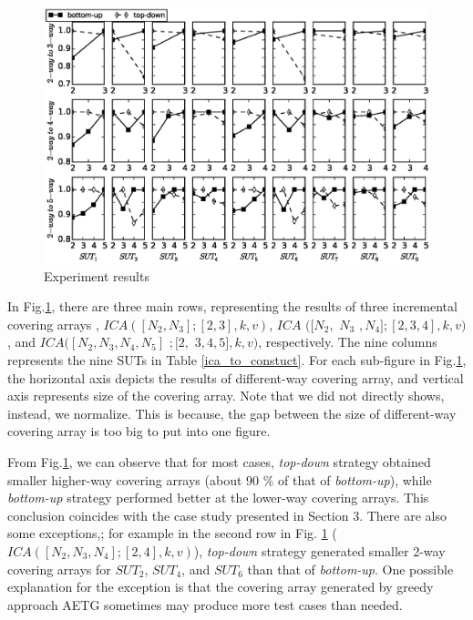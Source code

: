 \documentclass[conference]{IEEEtran}
\theoremstyle{definition}
\begin{document}
\begin{figure}[htbp]
\center
 \includegraphics[width=6.0in]{experiment.eps}
\caption{Experiment results}
\label{experiement}
\end{figure}


In Fig.\ref{experiement}, there are three main rows, representing the results of three incremental covering arrays , $ICA([N_{2},N_{3}]; [2, 3], k ,v)$, $ICA$ $([N_{2},$ $N_{3}$ $,N_{4}];[2, 3,4], k ,v)$, and $ICA([N_{2},N_{3},N_{4},N_{5}]$ $;[2,$ $ 3,4,5], k ,v)$, respectively.  The nine columns represents the nine SUTs in Table \ref{ica_to_constuct}. For each sub-figure in Fig.\ref{experiement}, the horizontal axis depicts the results of different-way covering array, and vertical axis represents size of the covering array. Note that we did not directly shows, instead, we normalize. This is because, the gap between the size of different-way covering array is too big to put into one figure.

From Fig.\ref{experiement}, we can observe that for most cases, \emph{top-down} strategy obtained smaller higher-way covering arrays (about 90 \% of that of \emph{bottom-up}), while \emph{bottom-up} strategy performed better at the lower-way covering arrays. This conclusion coincides with the case study presented in Section 3.  There are also some exceptions,; for example in the second row in Fig. \ref{experiement} ($ICA([N_{2},N_{3},N_{4}]; [2, 4], k ,v)$), \emph{top-down} strategy generated smaller 2-way covering arrays for $SUT_{2}$, $SUT_{4}$, and $SUT_{6}$ than that of \emph{bottom-up}. One possible explanation for the exception is that the covering array generated by greedy approach AETG sometimes may produce more test cases than needed.
\end{document}
